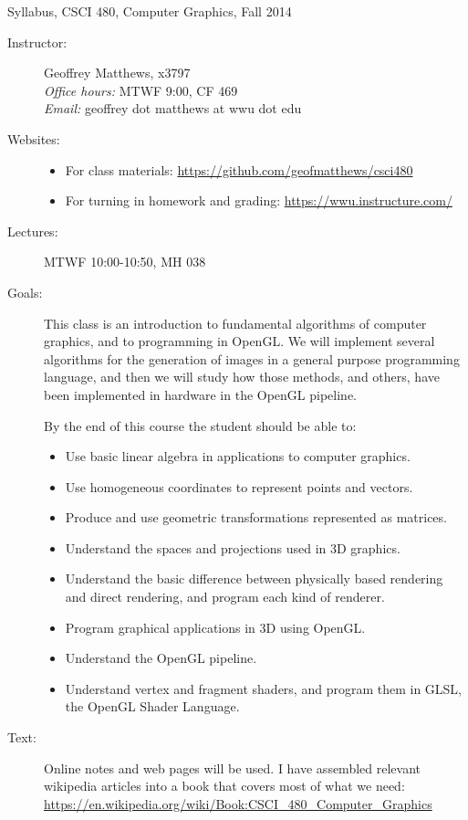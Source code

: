 \documentclass[]{article}
\begin{document}
\centerline{\large Syllabus, CSCI 480, Computer Graphics, Fall 2014}

\begin{description}

  \item[Instructor:] Geoffrey Matthews, x3797\\
    {\em Office hours:} MTWF 9:00, CF 469\\
    {\em Email:} geoffrey dot matthews at wwu dot edu
    
\item[Websites:]\mbox{}
\begin{itemize}
  \item For class materials: \url{https://github.com/geofmatthews/csci480}
  \item For turning in homework and
    grading: \url{https://wwu.instructure.com/} 
\end{itemize}

\item[Lectures:] MTWF 10:00-10:50, MH 038

\item[Goals:]  This class is an introduction to fundamental algorithms
  of computer graphics, and to programming in OpenGL.  We will 
  implement several  algorithms for the generation of images in a
  general purpose programming language, and then we will
  study how those methods, and others, have been implemented in
  hardware in the OpenGL pipeline.

By the end of this course the student should be able to:
\begin{itemize}
\item Use basic linear algebra in applications to computer
  graphics. 
\item Use homogeneous coordinates to represent points and vectors.
\item Produce and use geometric transformations
  represented as matrices.
\item Understand the spaces and projections used in 3D graphics.
\item Understand the basic difference between physically based
  rendering and direct rendering, and program each kind of renderer.
\item Program graphical applications in 3D using OpenGL.
\item Understand the OpenGL pipeline.
\item Understand vertex and fragment shaders, and program
  them in GLSL, the OpenGL Shader Language.
\end{itemize}
\item[Text:]  Online notes and web
  pages will be used.  I have assembled relevant wikipedia articles
  into a book that covers most of what we need: \\
  \url{https://en.wikipedia.org/wiki/Book:CSCI_480_Computer_Graphics}
  

\end{description}
\end{document}
